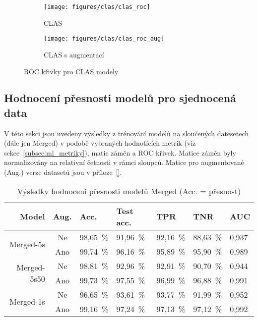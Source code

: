\begin{figure}[!htb]
    \centering
    \begin{subfigure}[h]{0.42\linewidth}
        \texttt{[image: figures/clas/clas\_roc]}
        \caption{CLAS}
    \end{subfigure}
    \hspace{0.1cm}
    \begin{subfigure}[h]{0.42\linewidth}
        \texttt{[image: figures/clas/clas\_roc\_aug]}
        \caption{CLAS s augmentací}
    \end{subfigure}
    \caption{ROC křivky pro CLAS modely}
    \label{fig:results_roc_clas}
\end{figure}

\subsection{Hodnocení přesnosti modelů pro sjednocená data}
\label{subsec:merged_models}
V této sekci jsou uvedeny výsledky z trénování modelů na sloučených datesetech
(dále jen Merged) v podobě vybraných hodnotících metrik (viz
sekce~\ref{subsec:ml_metriky}), matic záměn a ROC křivek. Matice záměn byly
normalizovány na relativní četnosti v rámci sloupců. Matice pro augmentované
(Aug.) verze datasetů jsou v příloze~\ref{}.

\begin{table}[h]
    \small
    \centering
    \caption{Výsledky hodnocení přesnosti modelů Merged (Acc. = přesnost)}
    \begin{tabular*}{\linewidth}{@{\extracolsep{\fill}} r|c|lllll @{}}
        \toprule
        Model                        & Aug. & Acc.     & Test acc. & TPR      & TNR      & AUC   \\ \midrule
        \multirow{2}{*}{Merged-5s}   & Ne   & 98,65~\% & 91,96~\%  & 92,16~\% & 88,63~\% & 0,937 \\
        & Ano  & 99,74~\% & 96,16~\%  & 95,89~\% & 95,90~\% & 0,989 \\ \midrule
        \multirow{2}{*}{Merged-5s50} & Ne   & 98,81~\% & 92,96~\%  & 92,91~\% & 90,70~\% & 0,944 \\
        & Ano  & 99,73~\% & 97,55~\%  & 96,99~\% & 96,88~\% & 0,991 \\ \midrule
        \multirow{2}{*}{Merged-1s}   & Ne   & 96,65~\% & 93,61~\%  & 93,77~\% & 91,99~\% & 0,952 \\
        & Ano  & 99,16~\% & 97,24~\%  & 97,13~\% & 97,12~\% & 0,992 \\
        \bottomrule
    \end{tabular*}
    \label{tab:merged}
\end{table}

